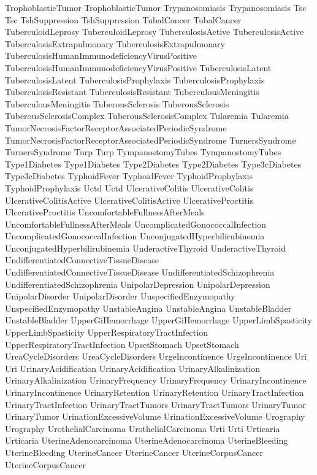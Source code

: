  TrophoblasticTumor
 TrophoblasticTumor
 Trypanosomiasis
 Trypanosomiasis
 Tsc
 Tsc
 TshSuppression
 TshSuppression
 TubalCancer
 TubalCancer
 TuberculoidLeprosy
 TuberculoidLeprosy
 TuberculosisActive
 TuberculosisActive
 TuberculosisExtrapulmonary
 TuberculosisExtrapulmonary
 TuberculosisHumanImmunodeficiencyVirusPositive
 TuberculosisHumanImmunodeficiencyVirusPositive
 TuberculosisLatent
 TuberculosisLatent
 TuberculosisProphylaxis
 TuberculosisProphylaxis
 TuberculosisResistant
 TuberculosisResistant
 TuberculousMeningitis
 TuberculousMeningitis
 TuberousSclerosis
 TuberousSclerosis
 TuberousSclerosisComplex
 TuberousSclerosisComplex
 Tularemia
 Tularemia
 TumorNecrosisFactorReceptorAssociatedPeriodicSyndrome
 TumorNecrosisFactorReceptorAssociatedPeriodicSyndrome
 TurnersSyndrome
 TurnersSyndrome
 Turp
 Turp
 TympanostomyTubes
 TympanostomyTubes
 Type1Diabetes
 Type1Diabetes
 Type2Diabetes
 Type2Diabetes
 Type3cDiabetes
 Type3cDiabetes
 TyphoidFever
 TyphoidFever
 TyphoidProphylaxis
 TyphoidProphylaxis
 Uctd
 Uctd
 UlcerativeColitis
 UlcerativeColitis
 UlcerativeColitisActive
 UlcerativeColitisActive
 UlcerativeProctitis
 UlcerativeProctitis
 UncomfortableFullnessAfterMeals
 UncomfortableFullnessAfterMeals
 UncomplicatedGonococcalInfection
 UncomplicatedGonococcalInfection
 UnconjugatedHyperbilirubinemia
 UnconjugatedHyperbilirubinemia
 UnderactiveThyroid
 UnderactiveThyroid
 UndifferentiatedConnectiveTissueDisease
 UndifferentiatedConnectiveTissueDisease
 UndifferentiatedSchizophrenia
 UndifferentiatedSchizophrenia
 UnipolarDepression
 UnipolarDepression
 UnipolarDisorder
 UnipolarDisorder
 UnspecifiedEnzymopathy
 UnspecifiedEnzymopathy
 UnstableAngina
 UnstableAngina
 UnstableBladder
 UnstableBladder
 UpperGiHemorrhage
 UpperGiHemorrhage
 UpperLimbSpasticity
 UpperLimbSpasticity
 UpperRespiratoryTractInfection
 UpperRespiratoryTractInfection
 UpsetStomach
 UpsetStomach
 UreaCycleDisorders
 UreaCycleDisorders
 UrgeIncontinence
 UrgeIncontinence
 Uri
 Uri
 UrinaryAcidification
 UrinaryAcidification
 UrinaryAlkalinization
 UrinaryAlkalinization
 UrinaryFrequency
 UrinaryFrequency
 UrinaryIncontinence
 UrinaryIncontinence
 UrinaryRetention
 UrinaryRetention
 UrinaryTractInfection
 UrinaryTractInfection
 UrinaryTractTumors
 UrinaryTractTumors
 UrinaryTumor
 UrinaryTumor
 UrinationExcessiveVolume
 UrinationExcessiveVolume
 Urography
 Urography
 UrothelialCarcinoma
 UrothelialCarcinoma
 Urti
 Urti
 Urticaria
 Urticaria
 UterineAdenocarcinoma
 UterineAdenocarcinoma
 UterineBleeding
 UterineBleeding
 UterineCancer
 UterineCancer
 UterineCorpusCancer
 UterineCorpusCancer
